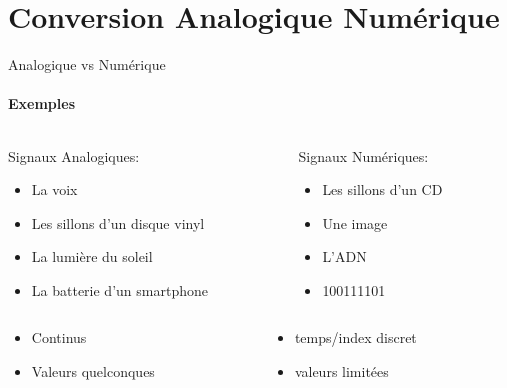 \documentclass{beamer}
\begin{document}
\section{Conversion Analogique Numérique}
\begin{frame}{Analogique vs Numérique}
  \framesubtitle{Exemples}
  \begin{columns}
    \begin{column}{.5\textwidth}
      Signaux Analogiques:\pause[2]
      \begin{itemize}
        \item La voix
        \item Les sillons d'un disque vinyl
        \item La lumière du soleil
        \item La batterie d'un smartphone
      \end{itemize}
      \pause[3]
    \end{column}
    \begin{column}{.5\textwidth}
      Signaux Numériques:\pause[4]
      \begin{itemize}
        \item Les sillons d'un CD
        \item Une image
        \item L'ADN
        \item 100111101
      \end{itemize}
    \end{column}
  \end{columns}
\pause[5]
  \begin{columns}
    \begin{column}{.5\textwidth}
       \begin{block}{}
        \begin{itemize}
          \item Continus
          \item Valeurs quelconques
        \end{itemize}
      \end{block}
    \end{column}
    \begin{column}{.5\textwidth}
      \begin{block}{}
        \begin{itemize}
          \item temps/index discret
          \item valeurs limitées
        \end{itemize}
      \end{block}
    \end{column}
  \end{columns}
\end{frame}
\end{document}
